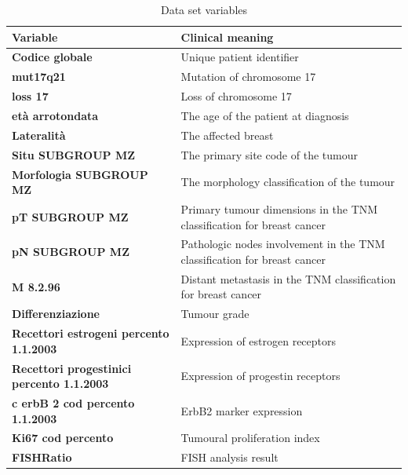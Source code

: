 \begin{table}[htbp]
\centering
\caption{Data set variables}
\begin{tabularx}{\textwidth}{@{} l Y @{}}
\toprule 
\textbf{Variable} & Clinical meaning \\
\midrule 
\textbf{Codice globale} & Unique patient identifier \\
\textbf{mut17q21} & Mutation of chromosome 17 \\
\textbf{loss 17} & Loss of chromosome 17 \\
\textbf{et\`a arrotondata} & The age of the patient at diagnosis \\
\textbf{Lateralit\`a} & The affected breast \\
\textbf{Situ SUBGROUP MZ} & The primary site code of the tumour \\
\textbf{Morfologia SUBGROUP MZ} & The morphology classification of the tumour \\
\textbf{pT SUBGROUP MZ} & Primary tumour dimensions in the TNM classification for breast cancer \\
\textbf{pN SUBGROUP MZ} & Pathologic nodes involvement in the TNM classification for breast cancer \\
\textbf{M 8.2.96} & Distant metastasis in the TNM classification for breast cancer \\
\textbf{Differenziazione} & Tumour grade \\
\textbf{Recettori estrogeni percento 1.1.2003} & Expression of estrogen receptors \\
\textbf{Recettori progestinici percento 1.1.2003} & Expression of progestin receptors \\
\textbf{c erbB 2  cod percento 1.1.2003} & ErbB2 marker expression \\
\textbf{Ki67 cod percento} & Tumoural proliferation index \\
\textbf{FISHRatio} & FISH analysis result \\
\bottomrule
\end{tabularx}
\label{tab:datasetvariables}
\end{table}

